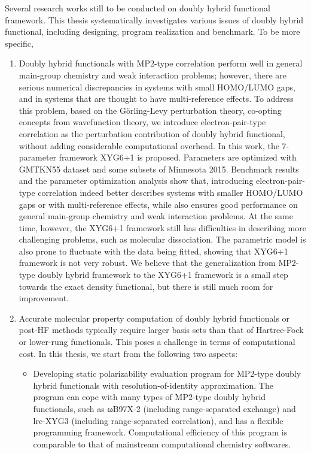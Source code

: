 \begin{abstract*}
Several research works still to be conducted on doubly hybrid functional framework. This thesis systematically investigates various issues of doubly hybrid functional, including designing, program realization and benchmark. To be more specific,
\begin{enumerate}[nosep]
\item Doubly hybrid functionals with MP2-type correlation perform well in general main-group chemistry and weak interaction problems; however, there are serious numerical discrepancies in systems with small HOMO/LUMO gaps, and in systems that are thought to have multi-reference effects. To address this problem, based on the Görling-Levy perturbation theory, co-opting concepts from wavefunction theory, we introduce electron-pair-type correlation as the perturbation contribution of doubly hybrid functional, without adding considerable computational overhead. In this work, the 7-parameter framework XYG6+1 is proposed. Parameters are optimized with GMTKN55 dataset and some subsets of Minnesota 2015. Benchmark results and the parameter optimization analysis show that, introducing electron-pair-type correlation indeed better describes systems with smaller HOMO/LUMO gaps or with multi-reference effects, while also ensures good performance on general main-group chemistry and weak interaction problems. At the same time, however, the XYG6+1 framework still has difficulties in describing more challenging problems, such as molecular dissociation. The parametric model is also prone to fluctuate with the data being fitted, showing that XYG6+1 framework is not very robust. We believe that the generalization from MP2-type doubly hybrid framework to the XYG6+1 framework is a small step towards the exact density functional, but there is still much room for improvement.
\item Accurate molecular property computation of doubly hybrid functionals or post-HF methods typically require larger basis sets than that of Hartree-Fock or lower-rung functionals. This poses a challenge in terms of computational cost. In this thesis, we start from the following two aspects:
\begin{itemize}[nosep]
    \item Developing static polarizability evaluation program for MP2-type doubly hybrid functionals with resolution-of-identity approximation. The program can cope with many types of MP2-type doubly hybrid functionals, such as ωB97X-2 (including range-separated exchange) and lrc-XYG3 (including range-separated correlation), and has a flexible programming framework. Computational efficiency of this program is comparable to that of mainstream computational chemistry softwares.

\end{itemize}
\end{enumerate}
\end{abstract*}
